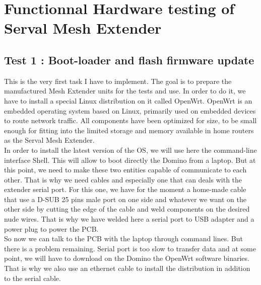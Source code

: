 \chapter{Functionnal Hardware testing of Serval Mesh Extender}

\section{Test 1 : Boot-loader and flash firmware update}

This is the very first task I have to implement. The goal is to prepare the manufactured Mesh Extender units for the tests and use. In order to do it, we have to install a special Linux distribution on it called OpenWrt. OpenWrt is an embedded operating system based on Linux, primarily used on embedded devices to route network traffic. All components have been optimized for size, to be small enough for fitting into the limited storage and memory available in home routers as the Serval Mesh Extender. \\
In order to install the latest version of the OS, we will use here the command-line interface Shell. This will allow to boot directly the Domino from a laptop. But at this point, we need to make these two entities capable of communicate to each other. That is why we need cables and especially one that can deals with the extender serial port. For this one, we have for the moment a home-made cable that use a D-SUB 25 pins male port on one side and whatever we want on the other side by cutting the edge of the cable and weld components on the desired nude wires. That is why we have welded here a serial port to USB adapter and a power plug to power the PCB. \\
So now we can talk to the PCB with the laptop through command lines. But there is a problem remaining. Serial port is too slow to transfer data and at some point, we will have to download on the Domino the OpenWrt software binaries. That is why we also use an ethernet cable to install the distribution in addition to the serial cable.
\\ 

